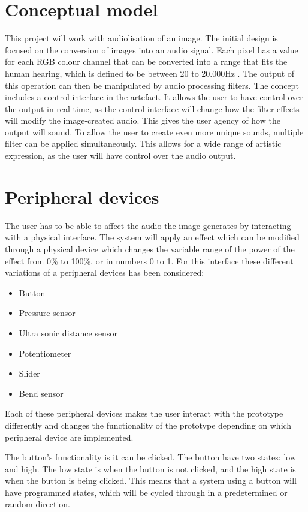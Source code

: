 \section{Conceptual model}\label{sec:conceptualmodel}
This project will work with audiolisation of an image. The initial design is focused on the conversion of images into an audio signal. Each pixel has a value for each RGB colour channel that can be converted into a range that fits the human hearing, which is defined to be between 20 to 20.000Hz \cite{Dsp1997}. The output of this operation can then be manipulated by audio processing filters. The concept includes a control interface in the artefact. It allows the user to have control over the output in real time, as the control interface will change how the filter effects will modify the image-created audio. This gives the user agency of how the output will sound. To allow the user to create even more unique sounds, multiple filter can be applied simultaneously. This allows for a wide range of artistic expression, as the user will have control over the audio output.


\section{Peripheral devices}\label{sec:periphealdevices}
The user has to be able to affect the audio the image generates by interacting with a physical interface. The system will apply an effect which can be modified through a physical device which changes the variable range of the power of the effect from 0\% to 100\%, or in numbers 0 to 1. For this interface these different variations of a peripheral devices has been considered: 

\begin{itemize}
\item Button
\item Pressure sensor
\item Ultra sonic distance sensor
\item Potentiometer
\item Slider
\item Bend sensor
\end{itemize}

Each of these peripheral devices makes the user interact with the prototype differently and changes the functionality of the prototype depending on which peripheral device are implemented.

The button's functionality is it can be clicked. The button have two states: low and high. The low state is when the button is not clicked, and the high state is when the button is being clicked. This means that a system using a button will have programmed states, which will be cycled through in a predetermined or random direction.


